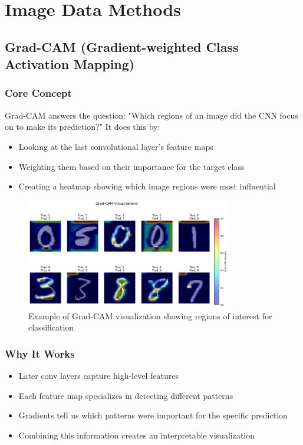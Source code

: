 \documentclass{article}
\begin{document}
\pagebreak
\section{Image Data Methods}

\subsection{Grad-CAM (Gradient-weighted Class Activation Mapping)}

\subsubsection{Core Concept}
Grad-CAM answers the question: "Which regions of an image did the CNN focus on to make its prediction?" It does this by:
\begin{itemize}
    \item Looking at the last convolutional layer's feature maps
    \item Weighting them based on their importance for the target class
    \item Creating a heatmap showing which image regions were most influential
\end{itemize}

\begin{figure}[h]
    \centering
    \includegraphics[width=0.8\textwidth]{images/grad_cam.png}
    \caption{Example of Grad-CAM visualization showing regions of interest for classification}
    \label{fig:grad_cam}
\end{figure}

\subsubsection{Why It Works}
\begin{itemize}
    \item Later conv layers capture high-level features
    \item Each feature map specializes in detecting different patterns
    \item Gradients tell us which patterns were important for the specific prediction
    \item Combining this information creates an interpretable visualization
\end{itemize}
\end{document}
